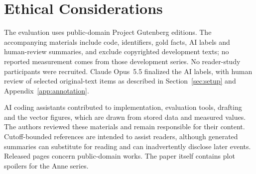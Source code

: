 \section*{Ethical Considerations}
\label{sec:ethics}

The evaluation uses public-domain Project Gutenberg editions. The accompanying materials include code,
identifiers, gold facts, AI labels and human-review summaries, and exclude copyrighted development texts; no reported
measurement comes from those development series. No reader-study participants were recruited.
Claude Opus~5.5 finalized the AI labels\ifnwhuman{}, with human review of selected original-text
items\fi{} as described in Section~\ref{sec:setup} and Appendix~\ref{app:annotation}.

AI coding assistants contributed to implementation, evaluation tools, drafting and the
vector figures, which are drawn from stored data and measured values. The authors reviewed these materials and remain responsible
for their content. Cutoff-bounded references are intended to assist readers, although generated
summaries can substitute for reading and can inadvertently disclose later events. Released
pages concern public-domain works. The paper itself contains plot spoilers for the Anne series.
